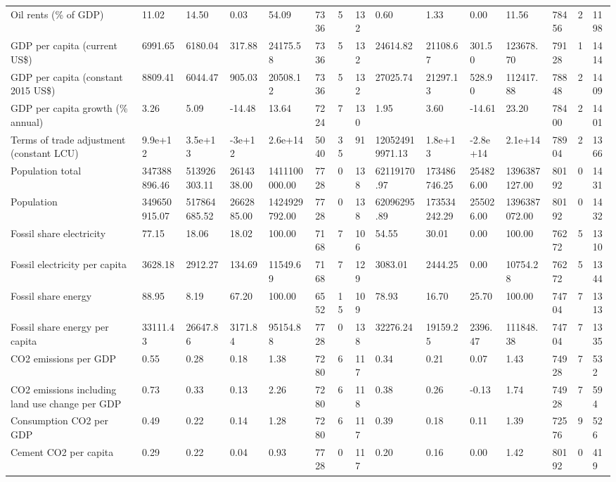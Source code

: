 \begin{longtable}{lllllllllllllll}
Oil rents (\% of GDP) & 11.02 & 14.50 & 0.03 & 54.09 & 7336 & 5 & 132 & 0.60 & 1.33 & 0.00 & 11.56 & 78456 & 2 & 1198\\
GDP per capita (current US\$) & 6991.65 & 6180.04 & 317.88 & 24175.58 & 7336 & 5 & 132 & 24614.82 & 21108.67 & 301.50 & 123678.70 & 79128 & 1 & 1414\\
GDP per capita (constant 2015 US\$) & 8809.41 & 6044.47 & 905.03 & 20508.12 & 7336 & 5 & 132 & 27025.74 & 21297.13 & 528.90 & 112417.88 & 78848 & 2 & 1409\\
\addlinespace
GDP per capita growth (\% annual) & 3.26 & 5.09 & -14.48 & 13.64 & 7224 & 7 & 130 & 1.95 & 3.60 & -14.61 & 23.20 & 78400 & 2 & 1401\\
Terms of trade adjustment (constant LCU) & 9.9e+12 & 3.5e+13 & -3e+12 & 2.6e+14 & 5040 & 35 & 91 & 120524919971.13 & 1.8e+13 & -2.8e+14 & 2.1e+14 & 78904 & 2 & 1366\\
Population total & 347388896.46 & 513926303.11 & 2614338.00 & 1411100000.00 & 7728 & 0 & 138 & 62119170.97 & 173486746.25 & 254826.00 & 1396387127.00 & 80192 & 0 & 1431\\
Population & 349650915.07 & 517864685.52 & 2662885.00 & 1424929792.00 & 7728 & 0 & 138 & 62096295.89 & 173534242.29 & 255026.00 & 1396387072.00 & 80192 & 0 & 1432\\
Fossil share electricity & 77.15 & 18.06 & 18.02 & 100.00 & 7168 & 7 & 106 & 54.55 & 30.01 & 0.00 & 100.00 & 76272 & 5 & 1310\\
\addlinespace
Fossil electricity per capita & 3628.18 & 2912.27 & 134.69 & 11549.69 & 7168 & 7 & 129 & 3083.01 & 2444.25 & 0.00 & 10754.28 & 76272 & 5 & 1344\\
Fossil share energy & 88.95 & 8.19 & 67.20 & 100.00 & 6552 & 15 & 109 & 78.93 & 16.70 & 25.70 & 100.00 & 74704 & 7 & 1313\\
Fossil share energy per capita & 33111.43 & 26647.86 & 3171.84 & 95154.88 & 7728 & 0 & 138 & 32276.24 & 19159.25 & 2396.47 & 111848.38 & 74704 & 7 & 1335\\
CO2 emissions per GDP & 0.55 & 0.28 & 0.18 & 1.38 & 7280 & 6 & 117 & 0.34 & 0.21 & 0.07 & 1.43 & 74928 & 7 & 532\\
CO2 emissions including land use change per GDP & 0.73 & 0.33 & 0.13 & 2.26 & 7280 & 6 & 118 & 0.38 & 0.26 & -0.13 & 1.74 & 74928 & 7 & 594\\
\addlinespace
Consumption CO2 per GDP & 0.49 & 0.22 & 0.14 & 1.28 & 7280 & 6 & 117 & 0.39 & 0.18 & 0.11 & 1.39 & 72576 & 9 & 526\\
Cement CO2 per capita & 0.29 & 0.22 & 0.04 & 0.93 & 7728 & 0 & 117 & 0.20 & 0.16 & 0.00 & 1.42 & 80192 & 0 & 419\\

\end{longtable}
